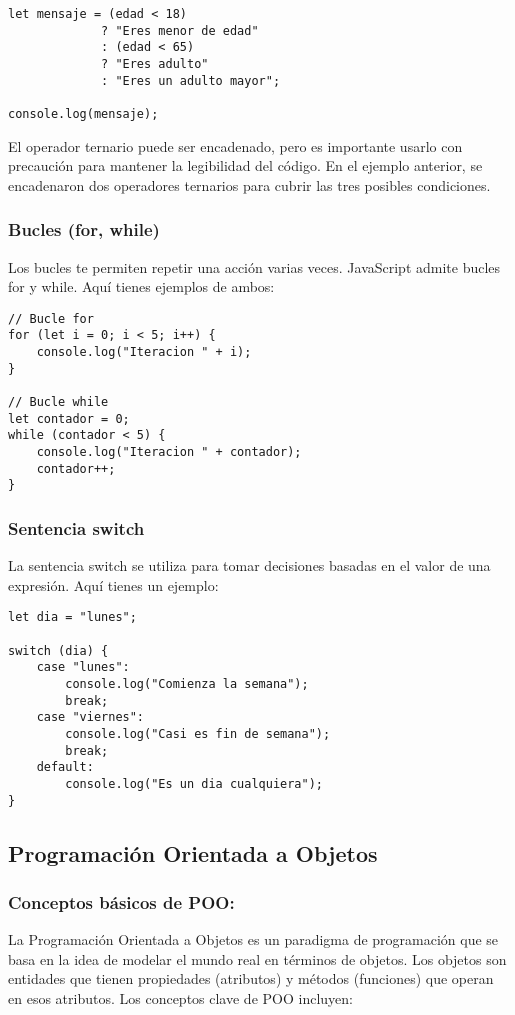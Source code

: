 \documentclass[executivepaper]{article}
\begin{document}
\begin{lstlisting}
let mensaje = (edad < 18) 
             ? "Eres menor de edad" 
             : (edad < 65) 
             ? "Eres adulto" 
             : "Eres un adulto mayor";

console.log(mensaje);
\end{lstlisting}

El operador ternario puede ser encadenado, pero es importante usarlo con precaución para mantener la legibilidad del código. En el ejemplo anterior, se encadenaron dos operadores ternarios para cubrir las tres posibles condiciones.
\subsubsection*{Bucles (for, while)}
Los bucles te permiten repetir una acción varias veces. JavaScript admite bucles for y while. Aquí tienes ejemplos de ambos:

\begin{lstlisting}
// Bucle for
for (let i = 0; i < 5; i++) {
    console.log("Iteracion " + i);
}

// Bucle while
let contador = 0;
while (contador < 5) {
    console.log("Iteracion " + contador);
    contador++;
}
\end{lstlisting}

\subsubsection*{Sentencia switch}
La sentencia switch se utiliza para tomar decisiones basadas en el valor de una expresión. Aquí tienes un ejemplo:

\begin{lstlisting}
let dia = "lunes";

switch (dia) {
    case "lunes":
        console.log("Comienza la semana");
        break;
    case "viernes":
        console.log("Casi es fin de semana");
        break;
    default:
        console.log("Es un dia cualquiera");
}  
\end{lstlisting}

\subsection{Programación Orientada a Objetos}
\subsubsection*{Conceptos básicos de POO:}
La Programación Orientada a Objetos es un paradigma de programación que se basa en la idea de modelar el mundo real en términos de objetos. Los objetos son entidades que tienen propiedades (atributos) y métodos (funciones) que operan en esos atributos. Los conceptos clave de POO incluyen:
\end{document}

